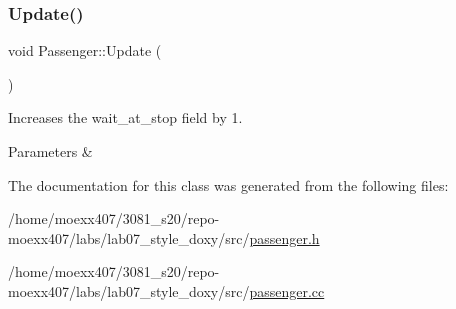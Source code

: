 \subsubsection{\texorpdfstring{Update()}{Update()}}
{\footnotesize\ttfamily void Passenger\+::\+Update (\begin{DoxyParamCaption}{ }\end{DoxyParamCaption})}



Increases the wait\+\_\+at\+\_\+stop field by 1. 


\begin{DoxyParams}{Parameters}
{\em } & \\
\hline
\end{DoxyParams}


The documentation for this class was generated from the following files\+:\begin{DoxyCompactItemize}
\item 
/home/moexx407/3081\+\_\+s20/repo-\/moexx407/labs/lab07\+\_\+style\+\_\+doxy/src/\hyperlink{passenger_8h}{passenger.\+h}\item 
/home/moexx407/3081\+\_\+s20/repo-\/moexx407/labs/lab07\+\_\+style\+\_\+doxy/src/\hyperlink{passenger_8cc}{passenger.\+cc}\end{DoxyCompactItemize}
